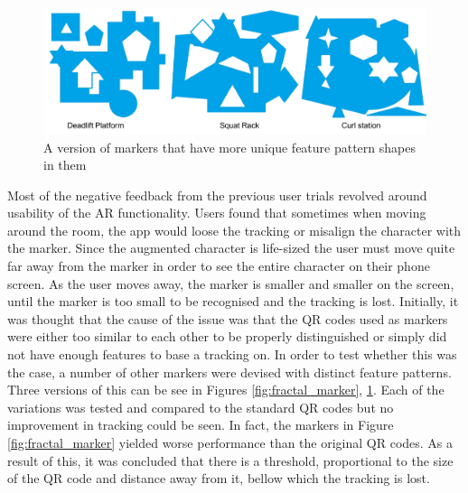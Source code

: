 \documentclass{l4proj}
\begin{document}
\begin{figure}
\centering
\includegraphics[width=\textwidth]{images/paint_marker.png}
\caption{A version of markers that have more unique feature pattern shapes in them} 
\label{fig:paint_marker}
\end{figure}

Most of the negative feedback from the previous user trials revolved around usability of the AR functionality. Users found that sometimes when moving around the room, the app would loose the tracking or misalign the character with the marker. Since the augmented character is life-sized the user must move quite far away from the marker in order to see the entire character on their phone screen. As the user moves away, the marker is smaller and smaller on the screen, until the marker is too small to be recognised and the tracking is lost. Initially, it was thought that the cause of the issue was that the QR codes used as markers were either too similar to each other to be properly distinguished or simply did not have enough features to base a tracking on. In order to test whether this was the case, a number of other markers were devised with distinct feature patterns. Three versions of this can be see in Figures \ref{fig:fractal_marker}, \ref{fig:paint_marker}. Each of the variations was tested and compared to the standard QR codes but no improvement in tracking could be seen. In fact, the markers in Figure \ref{fig:fractal_marker} yielded worse performance than the original QR codes. As a result of this, it was concluded that there is a threshold, proportional to the size of the QR code and distance away from it, bellow which the tracking is lost. 
\end{document}
